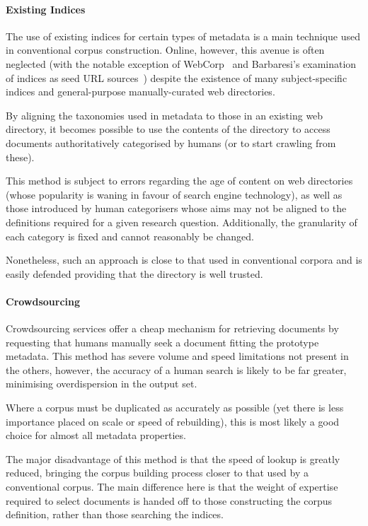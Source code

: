 \paragraph{Existing Indices}
The use of existing indices for certain types of metadata is a main technique used in conventional corpus construction.  Online, however, this avenue is often neglected (with the notable exception of WebCorp~ and Barbaresi's examination of indices as seed URL sources~\cite{barbaresi2014finding}) despite the existence of many subject-specific indices and general-purpose manually-curated web directories.

By aligning the taxonomies used in metadata to those in an existing web directory, it becomes possible to use the contents of the directory to access documents authoritatively categorised by humans (or to start crawling from these).

This method is subject to errors regarding the age of content on web directories (whose popularity is waning in favour of search engine technology), as well as those introduced by human categorisers whose aims may not be aligned to the definitions required for a given research question.  Additionally, the granularity of each category is fixed and cannot reasonably be changed.

Nonetheless, such an approach is close to that used in conventional corpora and is easily defended providing that the directory is well trusted.

\paragraph{Crowdsourcing}
Crowdsourcing services offer a cheap mechanism for retrieving documents by requesting that humans manually seek a document fitting the prototype metadata.  This method has severe volume and speed limitations not present in the others, however, the accuracy of a human search is likely to be far greater, minimising overdispersion in the output set.

Where a corpus must be duplicated as accurately as possible (yet there is less importance placed on scale or speed of rebuilding), this is most likely a good choice for almost all metadata properties.

The major disadvantage of this method is that the speed of lookup is greatly reduced, bringing the corpus building process closer to that used by a conventional corpus.  The main difference here is that the weight of expertise required to select documents is handed off to those constructing the corpus definition, rather than those searching the indices.







